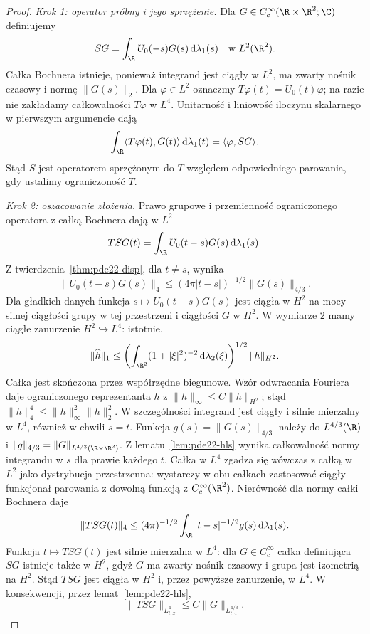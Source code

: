 \begin{proof}
\emph{Krok 1: operator próbny i jego sprzężenie.}
Dla $G\in C_c^\infty(\R\times\R^2;\C)$ definiujemy
\[
 SG=\int_\R U_0(-s)G(s)\,\mathrm d\lambda_1(s)
 \quad\text{w }L^2(\R^2).
\]
Całka Bochnera istnieje, ponieważ integrand jest
ciągły w $L^2$, ma zwarty nośnik czasowy i normę
$\|G(s)\|_2$. Dla $\varphi\in L^2$ oznaczmy
$T\varphi(t)=U_0(t)\varphi$; na razie nie zakładamy
całkowalności $T\varphi$ w $L^4$.
Unitarność i liniowość iloczynu skalarnego
w pierwszym argumencie dają
\[
 \int_\R\langle T\varphi(t),G(t)\rangle
               \,\mathrm d\lambda_1(t)
 =\langle\varphi,SG\rangle .
\]
Stąd $S$ jest operatorem sprzężonym do $T$ względem
odpowiedniego parowania, gdy ustalimy ograniczoność $T$.

\emph{Krok 2: oszacowanie złożenia.}
Prawo grupowe i przemienność ograniczonego operatora
z całką Bochnera dają w $L^2$
\[
 TSG(t)=\int_\R U_0(t-s)G(s)\,\mathrm d\lambda_1(s).
\]
Z twierdzenia~\ref{thm:pde22-disp}, dla $t\ne s$, wynika
\[
 \|U_0(t-s)G(s)\|_4
 \le (4\pi|t-s|)^{-1/2}\|G(s)\|_{4/3}.
\]
Dla gładkich danych funkcja $s\mapsto U_0(t-s)G(s)$
jest ciągła w $H^2$ na mocy silnej ciągłości
grupy w tej przestrzeni i ciągłości $G$ w $H^2$.
W wymiarze $2$ mamy ciągłe zanurzenie
$H^2\hookrightarrow L^4$: istotnie,
\[
 \|\widehat h\|_1\le
 \left(\int_{\R^2}(1+|\xi|^2)^{-2}
                   \,\mathrm d\lambda_2(\xi)\right)^{1/2}
 \|h\|_{H^2}.
\]
Całka jest skończona przez współrzędne biegunowe.
Wzór odwracania Fouriera daje ograniczonego
reprezentanta $h$ z $\|h\|_\infty\le C\|h\|_{H^2}$;
stąd $\|h\|_4^4\le\|h\|_\infty^2\|h\|_2^2$.
W szczególności integrand jest ciągły i silnie
mierzalny w $L^4$, również w chwili $s=t$.
Funkcja $g(s)=\|G(s)\|_{4/3}$ należy do $L^{4/3}(\R)$
i $\|g\|_{4/3}=\|G\|_{L^{4/3}(\R\times\R^2)}$.
Z lematu~\ref{lem:pde22-hls} wynika całkowalność
normy integrandu w $s$ dla prawie każdego $t$.
Całka w $L^4$ zgadza się wówczas z całką w $L^2$
jako dystrybucja przestrzenna: wystarczy w obu
całkach zastosować ciągły funkcjonał parowania
z dowolną funkcją z $C_c^\infty(\R^2)$.
Nierówność dla normy całki Bochnera daje
\[
 \|TSG(t)\|_4\le(4\pi)^{-1/2}
          \int_\R |t-s|^{-1/2}g(s)\,\mathrm d\lambda_1(s).
\]
Funkcja $t\mapsto TSG(t)$ jest silnie mierzalna
w $L^4$: dla $G\in C_c^\infty$ całka definiująca
$SG$ istnieje także w $H^2$, gdyż $G$
ma zwarty nośnik czasowy i grupa jest izometrią
na $H^2$. Stąd $TSG$ jest ciągła w $H^2$
i, przez powyższe zanurzenie, w $L^4$.
W konsekwencji, przez lemat~\ref{lem:pde22-hls},
\begin{equation}\label{eq:pde22-ttstar}
 \|TSG\|_{L^4_{t,x}}\le C\|G\|_{L^{4/3}_{t,x}}.
\end{equation}


\end{proof}
